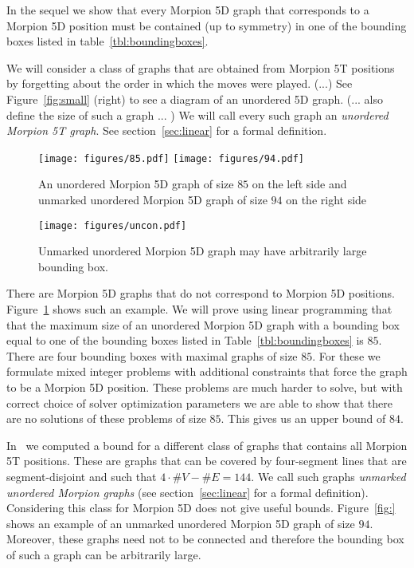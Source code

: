 In the sequel we show that every Morpion 5D graph that corresponds to a Morpion 5D position
    must be contained (up to symmetry) in one of the bounding boxes listed in table~\ref{tbl:boundingboxes}.

\begin{table}[ht]
\centering
 

\caption{}
\label{tbl:boundingboxes}
\end{table}

We will consider a class of graphs that are obtained from Morpion 5T positions by forgetting about 
  the order in which the moves were played.
(...) See Figure~\ref{fig:small} (right) to see a diagram of an unordered 5D graph. (... also define the size of such a graph ... )
We will call every such graph an \emph{unordered Morpion 5T graph}. See section~\ref{sec:linear} for a formal definition.

\begin{figure}[h]
    \texttt{[image: figures/85.pdf]}
    \texttt{[image: figures/94.pdf]}
    \caption{\label{fig:85}
      An unordered Morpion 5D graph of size $85$ on the left side
        and unmarked unordered Morpion 5D graph of size $94$ on the right side
    }
\end{figure}

\begin{figure}
  \centering
  \texttt{[image: figures/uncon.pdf]}
  \caption{
    Unmarked unordered Morpion 5D graph may have arbitrarily large bounding box.
  }
\end{figure}

There are Morpion 5D graphs that do not correspond to Morpion 5D positions.
Figure~\ref{fig:85} shows such an example.
We will prove using linear programming that that the maximum size of  an unordered Morpion 5D graph with 
  a bounding box equal to one of the bounding boxes listed in Table~\ref{tbl:boundingboxes}
  is $85$.
There are four bounding boxes with maximal graphs of size $85$. 
For these we formulate mixed integer problems with additional constraints that force the graph to
  be a Morpion 5D position.
These problems are much harder to solve, but with correct choice of solver optimization parameters we are able to show
  that there are no solutions of these problems of size $85$.
This gives us an upper bound of $84$.

In~\cite{} we computed a bound for a different class of graphs that contains all Morpion 5T positions.
These are graphs that can be covered by four-segment lines that are segment-disjoint and such that $4\cdot \# V - \# E = 144$.
We call such graphs \emph{unmarked unordered Morpion graphs} (see section~\ref{sec:linear} for a formal definition).
Considering this class for Morpion 5D  does not give useful bounds. 
Figure~\ref{fig:} shows an example of an unmarked unordered Morpion 5D graph of size $94$.
Moreover, these graphs need not to be connected and therefore the bounding box of such a graph
  can be arbitrarily large.
